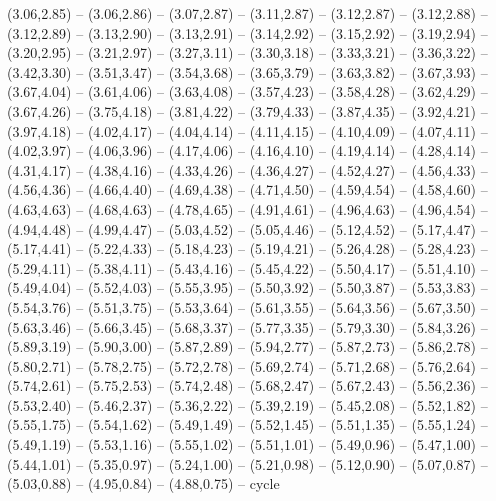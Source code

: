 {(3.06,2.85) -- (3.06,2.86) -- (3.07,2.87) -- (3.11,2.87) -- (3.12,2.87) -- (3.12,2.88) -- (3.12,2.89) -- (3.13,2.90) -- (3.13,2.91) -- (3.14,2.92) -- (3.15,2.92) -- (3.19,2.94) -- (3.20,2.95) -- (3.21,2.97) -- (3.27,3.11) -- (3.30,3.18) -- (3.33,3.21) -- (3.36,3.22) -- (3.42,3.30) -- (3.51,3.47) -- (3.54,3.68) -- (3.65,3.79) -- (3.63,3.82) -- (3.67,3.93) -- (3.67,4.04) -- (3.61,4.06) -- (3.63,4.08) -- (3.57,4.23) -- (3.58,4.28) -- (3.62,4.29) -- (3.67,4.26) -- (3.75,4.18) -- (3.81,4.22) -- (3.79,4.33) -- (3.87,4.35) -- (3.92,4.21) -- (3.97,4.18) -- (4.02,4.17) -- (4.04,4.14) -- (4.11,4.15) -- (4.10,4.09) -- (4.07,4.11) -- (4.02,3.97) -- (4.06,3.96) -- (4.17,4.06) -- (4.16,4.10) -- (4.19,4.14) -- (4.28,4.14) -- (4.31,4.17) -- (4.38,4.16) -- (4.33,4.26) -- (4.36,4.27) -- (4.52,4.27) -- (4.56,4.33) -- (4.56,4.36) -- (4.66,4.40) -- (4.69,4.38) -- (4.71,4.50) -- (4.59,4.54) -- (4.58,4.60) -- (4.63,4.63) -- (4.68,4.63) -- (4.78,4.65) -- (4.91,4.61) -- (4.96,4.63) -- (4.96,4.54) -- (4.94,4.48) -- (4.99,4.47) -- (5.03,4.52) -- (5.05,4.46) -- (5.12,4.52) -- (5.17,4.47) -- (5.17,4.41) -- (5.22,4.33) -- (5.18,4.23) -- (5.19,4.21) -- (5.26,4.28) -- (5.28,4.23) -- (5.29,4.11) -- (5.38,4.11) -- (5.43,4.16) -- (5.45,4.22) -- (5.50,4.17) -- (5.51,4.10) -- (5.49,4.04) -- (5.52,4.03) -- (5.55,3.95) -- (5.50,3.92) -- (5.50,3.87) -- (5.53,3.83) -- (5.54,3.76) -- (5.51,3.75) -- (5.53,3.64) -- (5.61,3.55) -- (5.64,3.56) -- (5.67,3.50) -- (5.63,3.46) -- (5.66,3.45) -- (5.68,3.37) -- (5.77,3.35) -- (5.79,3.30) -- (5.84,3.26) -- (5.89,3.19) -- (5.90,3.00) -- (5.87,2.89) -- (5.94,2.77) -- (5.87,2.73) -- (5.86,2.78) -- (5.80,2.71) -- (5.78,2.75) -- (5.72,2.78) -- (5.69,2.74) -- (5.71,2.68) -- (5.76,2.64) -- (5.74,2.61) -- (5.75,2.53) -- (5.74,2.48) -- (5.68,2.47) -- (5.67,2.43) -- (5.56,2.36) -- (5.53,2.40) -- (5.46,2.37) -- (5.36,2.22) -- (5.39,2.19) -- (5.45,2.08) -- (5.52,1.82) -- (5.55,1.75) -- (5.54,1.62) -- (5.49,1.49) -- (5.52,1.45) -- (5.51,1.35) -- (5.55,1.24) -- (5.49,1.19) -- (5.53,1.16) -- (5.55,1.02) -- (5.51,1.01) -- (5.49,0.96) -- (5.47,1.00) -- (5.44,1.01) -- (5.35,0.97) -- (5.24,1.00) -- (5.21,0.98) -- (5.12,0.90) -- (5.07,0.87) -- (5.03,0.88) -- (4.95,0.84) -- (4.88,0.75) -- cycle}
